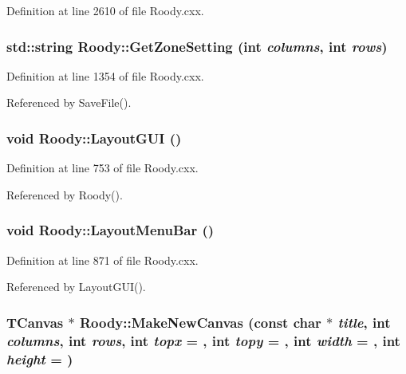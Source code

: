 Definition at line 2610 of file Roody.cxx.
\subsubsection[{GetZoneSetting}]{\setlength{\rightskip}{0pt plus 5cm}std::string Roody::GetZoneSetting (int {\em columns}, \/  int {\em rows})\hspace{0.3cm}{\ttfamily  [private]}}\label{classRoody_a849b5dc2b285b413b22d078fd885e98c}


Definition at line 1354 of file Roody.cxx.

Referenced by SaveFile().
\subsubsection[{LayoutGUI}]{\setlength{\rightskip}{0pt plus 5cm}void Roody::LayoutGUI ()\hspace{0.3cm}{\ttfamily  [private]}}\label{classRoody_acf0200144698e6d240142c0048cf2fae}


Definition at line 753 of file Roody.cxx.

Referenced by Roody().
\subsubsection[{LayoutMenuBar}]{\setlength{\rightskip}{0pt plus 5cm}void Roody::LayoutMenuBar ()\hspace{0.3cm}{\ttfamily  [private]}}\label{classRoody_a37f71f0fb2fee25f022a4a2e19008ff6}


Definition at line 871 of file Roody.cxx.

Referenced by LayoutGUI().
\subsubsection[{MakeNewCanvas}]{\setlength{\rightskip}{0pt plus 5cm}TCanvas $\ast$ Roody::MakeNewCanvas (const char $\ast$ {\em title}, \/  int {\em columns}, \/  int {\em rows}, \/  int {\em topx} = {}, \/  int {\em topy} = {}, \/  int {\em width} = {}, \/  int {\em height} = {})\hspace{0.3cm}{\ttfamily  [private]}}\label{classRoody_af861c1507f04e150620b2fd6a4adb40d}


